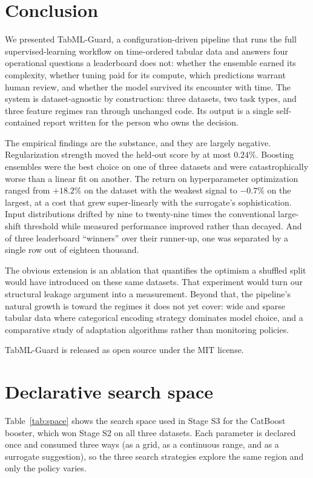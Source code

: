 \documentclass{ieeeaccess}
\begin{document}
\section{Conclusion}
\label{sec:conclusion}

We presented TabML-Guard, a configuration-driven pipeline that runs the full supervised-learning workflow on time-ordered tabular data and answers four operational questions a leaderboard does not: whether the ensemble earned its complexity, whether tuning paid for its compute, which predictions warrant human review, and whether the model survived its encounter with time. The system is dataset-agnostic by construction: three datasets, two task types, and three feature regimes ran through unchanged code. Its output is a single self-contained report written for the person who owns the decision.

The empirical findings are the substance, and they are largely negative. Regularization strength moved the held-out score by at most $0.24\%$. Boosting ensembles were the best choice on one of three datasets and were catastrophically worse than a linear fit on another. The return on hyperparameter optimization ranged from $+18.2\%$ on the dataset with the weakest signal to $-0.7\%$ on the largest, at a cost that grew super-linearly with the surrogate's sophistication. Input distributions drifted by nine to twenty-nine times the conventional large-shift threshold while measured performance improved rather than decayed. And of three leaderboard ``winners'' over their runner-up, one was separated by a single row out of eighteen thousand.

The obvious extension is an ablation that quantifies the optimism a shuffled split would have introduced on these same datasets. That experiment would turn our structural leakage argument into a measurement. Beyond that, the pipeline's natural growth is toward the regimes it does not yet cover: wide and sparse tabular data where categorical encoding strategy dominates model choice, and a comparative study of adaptation algorithms rather than monitoring policies.

TabML-Guard is released as open source under the MIT license.

\appendices
\section{Declarative search space}
\label{app:space}
Table~\ref{tab:space} shows the search space used in Stage S3 for the CatBoost booster, which won Stage S2 on all three datasets. Each parameter is declared once and consumed three ways (as a grid, as a continuous range, and as a surrogate suggestion), so the three search strategies explore the same region and only the policy varies.
\end{document}
